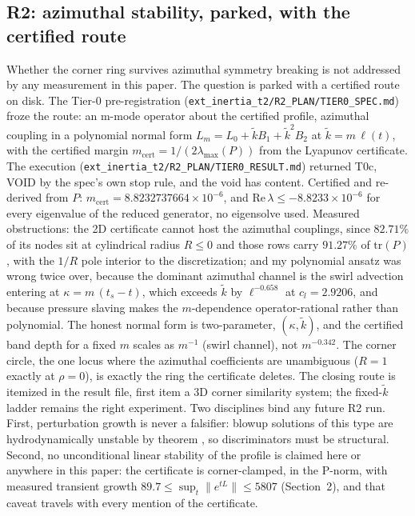 \subsection{R2: azimuthal stability, parked, with the certified route}\label{sec:r2parked}

Whether the corner ring survives azimuthal symmetry breaking is not
addressed by any measurement in this paper. The question is parked with
a certified route on disk. The Tier-0 pre-registration
(\texttt{ext\_inertia\_t2/R2\_PLAN/TIER0\_SPEC.md}) froze the route: an
m-mode operator about the certified profile, azimuthal coupling in a
polynomial normal form
$L_m = L_0 + \tilde{k} B_1 + \tilde{k}^2 B_2$ at
$\tilde{k} = m\,\ell(t)$, with the certified margin
$m_{\mathrm{cert}} = 1/(2\lambda_{\max}(P))$ from the Lyapunov
certificate. The execution
(\texttt{ext\_inertia\_t2/R2\_PLAN/TIER0\_RESULT.md}) returned T0c,
VOID by the spec's own stop rule, and the void has content. Certified
and re-derived from $P$:
$m_{\mathrm{cert}} = 8.8232737664\times10^{-6}$, and
$\mathrm{Re}\,\lambda \le -8.8233\times10^{-6}$ for every eigenvalue of
the reduced generator, no eigensolve used. Measured obstructions: the
2D certificate cannot host the azimuthal couplings, since $82.71\%$ of
its nodes sit at cylindrical radius $R \le 0$ and those rows carry
$91.27\%$ of $\mathrm{tr}(P)$, with the $1/R$ pole interior to the
discretization; and my polynomial ansatz was wrong twice over, because
the dominant azimuthal channel is the swirl advection entering at
$\kappa = m\,(t_s - t)$, which exceeds $\tilde{k}$ by
$\ell^{-0.658}$ at $c_l = 2.9206$, and because pressure slaving makes
the $m$-dependence operator-rational rather than polynomial. The honest
normal form is two-parameter, $(\kappa, \tilde{k})$, and the certified
band depth for a fixed $m$ scales as $m^{-1}$ (swirl channel), not
$m^{-0.342}$. The corner circle, the one locus where the azimuthal
coefficients are unambiguous ($R = 1$ exactly at $\rho = 0$), is
exactly the ring the certificate deletes. The closing route is
itemized in the result file, first item a 3D corner similarity system;
the fixed-$\tilde{k}$ ladder remains the right experiment. Two
disciplines bind any future R2 run. First, perturbation growth is never
a falsifier: blowup solutions of this type are hydrodynamically
unstable by theorem \cite{VasseurVishik2020}, so discriminators must be
structural. Second, no unconditional linear stability of the profile is
claimed here or anywhere in this paper: the certificate is
corner-clamped, in the P-norm, with measured transient growth
$89.7 \le \sup_t \|e^{tL}\| \le 5807$ (Section~2), and that caveat
travels with every mention of the certificate.

